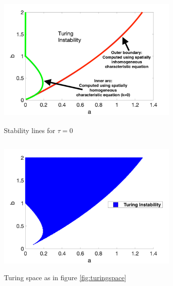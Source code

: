 \documentclass[12pt]{report}
\begin{document}
\begin{figure}[H]
    \centering
    \begin{subfigure}[b]{0.47\textwidth}
        \centering
        \includegraphics[width=9cm,height = 7cm]{bif0.png}
        \caption{Stability lines for $\tau=0$}
        \label{fig:bif0}
    \end{subfigure}
    \hfill
    \begin{subfigure}[b]{0.47\textwidth}
        \centering
        \includegraphics[width=9cm,height = 7cm]{turingspace.png}
        \caption{Turing space as in figure \ref{fig:turingspace}}
        \label{}
    \end{subfigure}
    \caption{}
    \label{fig:tspace1}
\end{figure}
\end{document}
